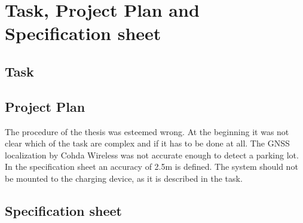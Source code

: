 \chapter{Task, Project Plan and Specification sheet}

\section{Task}\label{sec:task}


\section{Project Plan}

The procedure of the thesis was esteemed wrong. At the beginning it was not clear which of the task are complex and if it has to be done at all. The GNSS localization by Cohda Wireless was not accurate enough to detect a parking lot. In the specification sheet an accuracy of 2.5\;m is defined. 
The system should not be mounted to the charging device, as it is described in the task.



\section{Specification sheet}



\clearpage
\pagebreak
